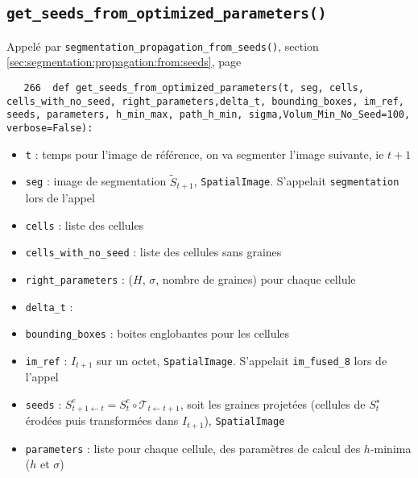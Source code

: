 \documentclass{article}
\def \mycolor {red}
\begin{document}
\subsection{\texttt{get\_seeds\_from\_optimized\_parameters()}}
\label{sec:get:seeds:from:optimized:parameters}
Appel\'e par \texttt{segmentation\_propagation\_from\_seeds()},
section \ref{sec:segmentation:propagation:from:seeds}, page \pageref{sec:segmentation:propagation:from:seeds}
\begin{verbatim}
   266	def get_seeds_from_optimized_parameters(t, seg, cells, cells_with_no_seed, right_parameters,delta_t, bounding_boxes, im_ref, seeds, parameters, h_min_max, path_h_min, sigma,Volum_Min_No_Seed=100, verbose=False):
\end{verbatim} 
\color{\mycolor}
\begin{itemize}
\itemsep -0.5ex
\item \verb|t| : temps pour l'image de r\'ef\'erence, on va segmenter l'image suivante, ie $t+1$
\item \verb|seg| :  image de segmentation $\tilde{S}_{t+1}$, \texttt{SpatialImage}. S'appelait \verb|segmentation|  lors de l'appel
\item \verb|cells| : liste des cellules
\item \verb|cells_with_no_seed| : liste des cellules sans graines
\item \verb|right_parameters| : ($H$, $\sigma$, nombre de graines) pour chaque cellule
\item \verb|delta_t| :
\item \verb|bounding_boxes| : boites englobantes pour les cellules
\item \verb|im_ref| : $I_{t+1}$ sur un octet, \texttt{SpatialImage}. S'appelait \verb|im_fused_8|  lors de l'appel
\item \verb|seeds| : $S^e_{t+1 \leftarrow t} = S^e_t \circ \mathcal{T}_{t \leftarrow t+1}$, soit les graines projet\'ees (cellules de $S^{\star}_t$ \'erod\'ees puis transform\'ees dans $I_{t+1}$), \texttt{SpatialImage}
\item \verb|parameters| : liste pour chaque cellule,  des param\`etres de calcul des $h$-minima ($h$ et $\sigma$)
\end{itemize}
\color{black}
\end{document}
